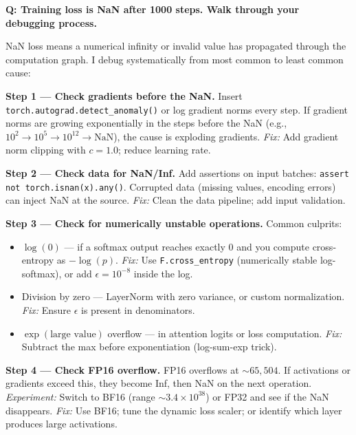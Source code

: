 \begin{interviewq}
\textbf{Q: Training loss is NaN after 1000 steps. Walk through your debugging process.}

 \quad {} \quad \badgefreq{\freqhigh}

\stronganswer

NaN loss means a numerical infinity or invalid value has propagated through the computation graph. I debug systematically from most common to least common cause:

\textbf{Step 1 --- Check gradients before the NaN.} Insert \texttt{torch.autograd.detect\_anomaly()} or log gradient norms every step. If gradient norms are growing exponentially in the steps before the NaN (e.g., $10^2 \to 10^5 \to 10^{12} \to \text{NaN}$), the cause is exploding gradients. \textit{Fix:} Add gradient norm clipping with $c = 1.0$; reduce learning rate.

\textbf{Step 2 --- Check data for NaN/Inf.} Add assertions on input batches: \texttt{assert not torch.isnan(x).any()}. Corrupted data (missing values, encoding errors) can inject NaN at the source. \textit{Fix:} Clean the data pipeline; add input validation.

\textbf{Step 3 --- Check for numerically unstable operations.} Common culprits:
\begin{itemize}
    \item $\log(0)$ --- if a softmax output reaches exactly 0 and you compute cross-entropy as $-\log(p)$. \textit{Fix:} Use \texttt{F.cross\_entropy} (numerically stable log-softmax), or add $\epsilon = 10^{-8}$ inside the log.
    \item Division by zero --- LayerNorm with zero variance, or custom normalization. \textit{Fix:} Ensure $\epsilon$ is present in denominators.
    \item $\exp(\text{large value})$ overflow --- in attention logits or loss computation. \textit{Fix:} Subtract the max before exponentiation (log-sum-exp trick).
\end{itemize}

\textbf{Step 4 --- Check FP16 overflow.} FP16 overflows at $\sim 65{,}504$. If activations or gradients exceed this, they become Inf, then NaN on the next operation. \textit{Experiment:} Switch to BF16 (range $\sim 3.4 \times 10^{38}$) or FP32 and see if the NaN disappears. \textit{Fix:} Use BF16; tune the dynamic loss scaler; or identify which layer produces large activations.


\end{interviewq}
